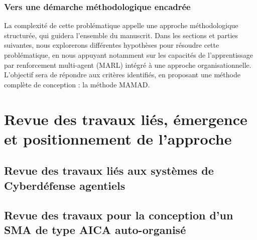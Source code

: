 \documentclass[ twoside,openright,titlepage,numbers=noenddot,headinclude,%
                footinclude=true,cleardoublepage=empty,abstractoff, %
                BCOR=5mm,paper=a4,fontsize=11pt,%
                french,american,%
                ]{scrreprt}
\begin{document}
\subsection*{Vers une démarche méthodologique encadrée}

La complexité de cette problématique appelle une approche méthodologique structurée, qui guidera l’ensemble du manuscrit. Dans les sections et parties suivantes, nous explorerons différentes hypothèses pour résoudre cette problématique, en nous appuyant notamment sur les capacités de l’apprentissage par renforcement multi-agent (MARL) intégré à une approche organisationnelle. L’objectif sera de répondre aux critères identifiés, en proposant une méthode complète de conception : la méthode \textsc{MAMAD}.




\chapter{Revue des travaux liés, émergence et positionnement de l'approche}

\section{Revue des travaux liés aux systèmes de Cyberdéfense agentiels}

\section{Revue des travaux pour la conception d'un SMA de type AICA auto-organisé}
\end{document}

